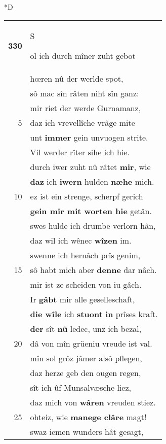 \documentclass[8pt,a4paper,notitlepage]{article}
\begin{document}
\begin{table}[ht]
\begin{minipage}[t]{0.5\linewidth}
\small
\begin{center}*D
\end{center}
\begin{tabular}{rl}
\textbf{330} & \begin{large}S\end{large}ol ich durch mîner zuht gebot\\ 
 & hœren nû der werlde spot,\\ 
 & sô mac sîn râten niht sîn ganz:\\ 
 & mir riet der werde Gurnamanz,\\ 
5 & daz ich vrevellîche vrâge mite\\ 
 & unt \textbf{immer} gein unvuogen strite.\\ 
 & Vil werder rîter sihe ich hie.\\ 
 & durch iwer zuht nû râtet \textbf{mir}, wie\\ 
 & \textbf{daz} ich \textbf{iwern} hulden \textbf{næhe} mich.\\ 
10 & ez ist ein strenge, scherpf gerich\\ 
 & \textbf{gein mir mit worten hie} getân.\\ 
 & swes hulde ich drumbe verlorn hân,\\ 
 & daz wil ich wênec \textbf{wîzen} im.\\ 
 & swenne ich hernâch prîs genim,\\ 
15 & sô habt mich aber \textbf{denne} dar nâch.\\ 
 & mir ist ze scheiden von iu gâch.\\ 
 & Ir \textbf{gâbt} mir alle geselleschaft,\\ 
 & \textbf{die wîle} ich \textbf{stuont} \textbf{in} prîses kraft.\\ 
 & \textbf{der} sît \textbf{nû} ledec, unz ich bezal,\\ 
20 & dâ von mîn grüeniu vreude ist val.\\ 
 & mîn sol grôz jâmer alsô pflegen,\\ 
 & daz herze geb den ougen regen,\\ 
 & sît ich ûf Munsalvæsche liez,\\ 
 & daz mich von \textbf{wâren} vreuden stiez.\\ 
25 & ohteiz, wie \textbf{manege clâre} magt!\\ 
 & swaz iemen wunders hât gesagt,\\ 

\end{tabular}
\end{minipage}
\end{table}
\end{document}
